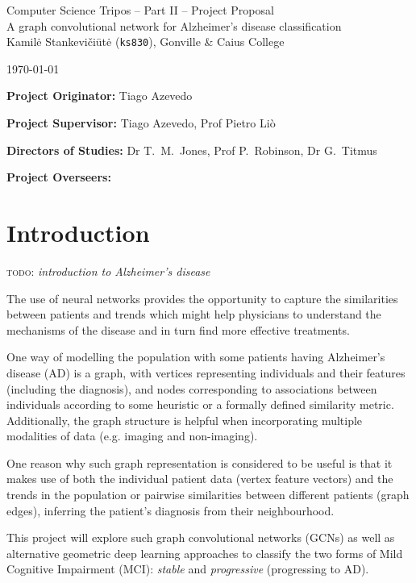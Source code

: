 \documentclass[12pt,a4paper,twoside]{article}
\begin{document}
\begin{center}
\Large
Computer Science Tripos -- Part II -- Project Proposal\\[4mm]
\LARGE
A graph convolutional network for Alzheimer's disease classification\\[4mm]

\large
Kamilė Stankevičiūtė (\texttt{ks830}), Gonville \& Caius College

\today %
\end{center}

\vspace{5mm}
\textbf{Project Originator:} Tiago Azevedo

\textbf{Project Supervisor:} Tiago Azevedo, Prof Pietro Liò

\textbf{Directors of Studies:} Dr T.~M.~Jones, Prof P.~Robinson, Dr G.~Titmus

\textbf{Project Overseers:} 


\section*{Introduction}

\textsc{todo:} \textit{introduction to Alzheimer's disease}

The use of neural networks provides the opportunity to capture the similarities between patients and trends which might help physicians to understand the mechanisms of the disease and in turn find more effective treatments. 

One way of modelling the population with some patients having Alzheimer's disease (AD) is a graph, with vertices representing individuals and their features (including the diagnosis), and nodes corresponding to associations between individuals according to some heuristic or a formally defined similarity metric. Additionally, the graph structure is helpful when incorporating multiple modalities of data (e.g. imaging and non-imaging).

One reason why such graph representation is considered to be useful is that it makes use of both the individual patient data (vertex feature vectors) and the trends in the population or pairwise similarities between different patients (graph edges), inferring the patient's diagnosis from their neighbourhood. 

This project will explore such graph convolutional networks (GCNs) as well as alternative geometric deep learning approaches to classify the two forms of Mild Cognitive Impairment (MCI): \textit{stable} and \textit{progressive} (progressing to AD).
\end{document}
